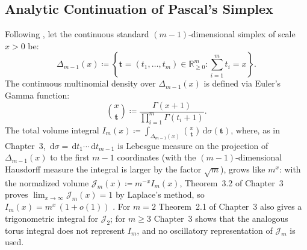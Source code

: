\documentclass[11pt,a4paper,reqno]{amsart}
\theoremstyle{definition}
\numberwithin{equation}{section}
\providecommand{\R}{\mathbb{R}}
\newcommand{\dif}{\,\mathrm{d}}
\providecommand{\xref}[2]{#2}
\providecommand{\R}{\mathbb{R}}
\begin{document}
\subsection{Analytic Continuation of Pascal's Simplex}
Following \cite{silvafilho2026pascal}, let the continuous standard $(m-1)$-dimensional simplex of scale $x > 0$ be:
\begin{equation}
    \label{eq:standard_simplex}
    \Delta_{m-1}(x) \coloneqq \left\{ \mathbf{t} = (t_1, \dots, t_m) \in \R_{\ge 0}^m \colon \sum_{i=1}^m t_i = x \right\}.
\end{equation}
The continuous multinomial density over $\Delta_{m-1}(x)$ is defined via Euler's Gamma function:
\begin{equation}
    \label{eq:continuous_multinomial}
    \binom{x}{\mathbf{t}} \coloneqq \frac{\Gamma(x + 1)}{\prod_{i=1}^m \Gamma(t_i + 1)}.
\end{equation}
The total volume integral $I_m(x) \coloneqq \int_{\Delta_{m-1}(x)} \binom{x}{\mathbf{t}} \dif \sigma(\mathbf{t})$, where, as in Chapter~3, $\dif\sigma = \dif t_1 \cdots \dif t_{m-1}$ is Lebesgue measure on the projection of $\Delta_{m-1}(x)$ to the first $m-1$ coordinates (with the $(m-1)$-dimensional Hausdorff measure the integral is larger by the factor $\sqrt{m}$), grows like $m^x$: with the normalized volume $\mathcal{J}_m(x) \coloneqq m^{-x} I_m(x)$, Theorem~\xref{chap03:thm:simplex_integral}{3.2} of Chapter~3 proves $\lim_{x \to \infty} \mathcal{J}_m(x) = 1$ by Laplace's method, so $I_m(x) = m^x\,(1 + o(1))$ \cite{silvafilho2026pascal}. For $m = 2$ Theorem~\xref{chap03:thm:2d_row_integral}{2.1} of Chapter~3 also gives a trigonometric integral for $\mathcal{J}_2$; for $m \ge 3$ Chapter~3 shows that the analogous torus integral does not represent $I_m$, and no oscillatory representation of $\mathcal{J}_m$ is used.
\end{document}
